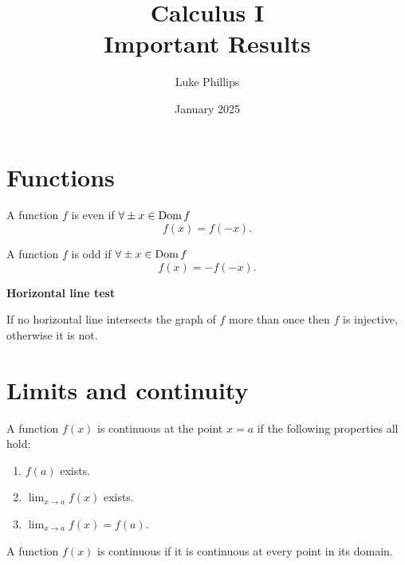 \documentclass[10pt, a4paper]{article}
\title{Calculus I \\
    \large Important Results}
\author{Luke Phillips}
\date{January 2025}
\begin{document}
\maketitle

\newpage

\tableofcontents

\newpage

\section{Functions}

\begin{definition}
    A function $f$ is even if $\forall \pm x \in \operatorname{Dom}{f}$
    \[
    f(x) = f(-x).
    \]
\end{definition}

\begin{definition}
    A function $f$ is odd if $\forall \pm x \in \operatorname{Dom}{f}$
    \[
    f(x) = -f(-x).
    \]
\end{definition}

\textbf{Horizontal line test}

If no horizontal line intersects the graph of $f$ more than once then $f$ is injective,
otherwise it is not.

\newpage

\section{Limits and continuity}

\begin{definition}
    A function $f(x)$ is continuous at the point $x = a$ if the following properties all hold:
    \begin{enumerate}[label = (\roman*)]
        \item $f(a)$ exists.
        
        \item $\lim_{x \rightarrow a}f(x)$ exists.
        
        \item $\lim_{x \rightarrow a}f(x) = f(a)$.
    \end{enumerate}
\end{definition}

\begin{definition}[Continuity]
    A function $f(x)$ is continuous if it is continuous at every point in its domain.
\end{definition}
\end{document}
